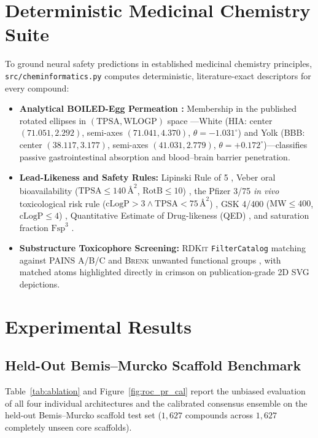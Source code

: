 \documentclass[10pt,twocolumn,letterpaper]{article}
\begin{document}
\section{Deterministic Medicinal Chemistry Suite}
To ground neural safety predictions in established medicinal chemistry principles, \texttt{src/cheminformatics.py} computes deterministic, literature-exact descriptors for every compound:
\begin{itemize}
  \item \textbf{Analytical BOILED-Egg Permeation \citep{daina2016boiled}:} Membership in the published rotated ellipses in $(\mathrm{TPSA}, \mathrm{WLOGP})$ space \citep{ertl2000fast,wildman1999prediction}—White (\textsc{HIA}: center $(71.051, 2.292)$, semi-axes $(71.041, 4.370)$, $\theta = -1.031^\circ$) and Yolk (\textsc{BBB}: center $(38.117, 3.177)$, semi-axes $(41.031, 2.779)$, $\theta = +0.172^\circ$)—classifies passive gastrointestinal absorption and blood–brain barrier penetration.
  \item \textbf{Lead-Likeness and Safety Rules:} Lipinski Rule of 5 \citep{lipinski1997experimental}, Veber oral bioavailability ($\mathrm{TPSA}\le 140\,\text{\AA}^2$, $\mathrm{RotB}\le 10$) \citep{veber2002molecular}, the Pfizer 3/75 \textit{in vivo} toxicological risk rule ($\mathrm{cLogP} > 3 \wedge \mathrm{TPSA} < 75\,\text{\AA}^2$) \citep{hughes2008physiochemical}, \textsc{GSK} 4/400 ($\mathrm{MW}\le 400$, $\mathrm{cLogP}\le 4$) \citep{gleeson2008generation}, Quantitative Estimate of Drug-likeness (\textsc{QED}) \citep{bickerton2012quantifying}, and saturation fraction $\mathrm{Fsp}^3$ \citep{lovering2009escape}.
  \item \textbf{Substructure Toxicophore Screening:} \textsc{RDKit} \texttt{FilterCatalog} matching against \textsc{PAINS} A/B/C \citep{baell2010new} and \textsc{Brenk} unwanted functional groups \citep{brenk2008lessons}, with matched atoms highlighted directly in crimson on publication-grade 2D \textsc{SVG} depictions.
\end{itemize}

\section{Experimental Results}

\subsection{Held-Out Bemis–Murcko Scaffold Benchmark}
Table~\ref{tab:ablation} and Figure~\ref{fig:roc_pr_cal} report the unbiased evaluation of all four individual architectures and the calibrated consensus ensemble on the held-out Bemis–Murcko scaffold test set ($1{,}627$ compounds across $1{,}627$ completely unseen core scaffolds).
\end{document}
